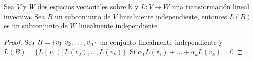 \begin{theorem}
Sea $V$ y $W$ dos espacios vectoriales sobre $\mathbb{K}$ y $L : V \to W$ una transformación lineal inyectiva. Sea $B$ un subconjunto de $V$ linealmente independiente, entonces $L(B)$ es un subconjunto de $W$ linealmente independiente. 
\end{theorem}

\begin{proof}
Sea $B =  \lbrace v_1, v_2, \ldots, v_n \rbrace$ un conjunto linealmente independiente y $L(B) = \{L(v_1), L(v_2), \ldots , L(v_k)\}$. Si $\alpha_1 L(v_1) + \ldots + \alpha_k L(v_k) = 0$
\end{proof}


